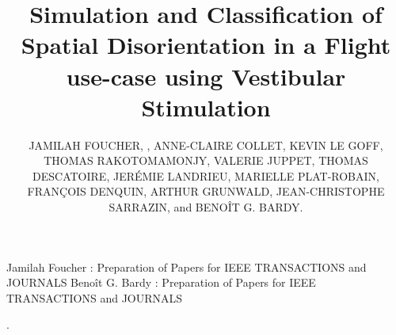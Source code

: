 \documentclass{ieeeaccess}
\begin{document}

\title{Simulation and Classification of Spatial Disorientation in a Flight use-case using Vestibular Stimulation}
\author{\uppercase{Jamilah Foucher}, ,
\uppercase{Anne-Claire Collet}, \uppercase{Kevin Le Goff}, \uppercase{Thomas Rakotomamonjy}, \uppercase{Valerie Juppet}, \uppercase{Thomas Descatoire}, \uppercase{Jerémie Landrieu}, \uppercase{Marielle Plat-Robain}, \uppercase{François Denquin}, \uppercase{Arthur Grunwald}, \uppercase{Jean-Christophe Sarrazin}, and \uppercase{Benoît G. Bardy}.}
\address[1]{EuroMov Digital Health in Motion, Univ Montpellier and IMT Mines Ales, Montpellier 34090 France (e-mail: benoit.bardy@umontpellier.fr)}
\address[2]{DTIS, ONERA, Salon de Provence 13300 France}
\address[3]{AIRBUS, Toulouse 31000 France}
\address[4]{AIRBUS Helicopters, Marignane 13700 France}
\address[5]{Human Design Group, Toulouse 31000 France}
\address[6]{Technion, Israel Institute of Technology 32000 Israel}

\markboth
{Jamilah Foucher \headeretal: Preparation of Papers for IEEE TRANSACTIONS and JOURNALS}
{Benoît G. Bardy \headeretal: Preparation of Papers for IEEE TRANSACTIONS and JOURNALS}

.
\end{document}
